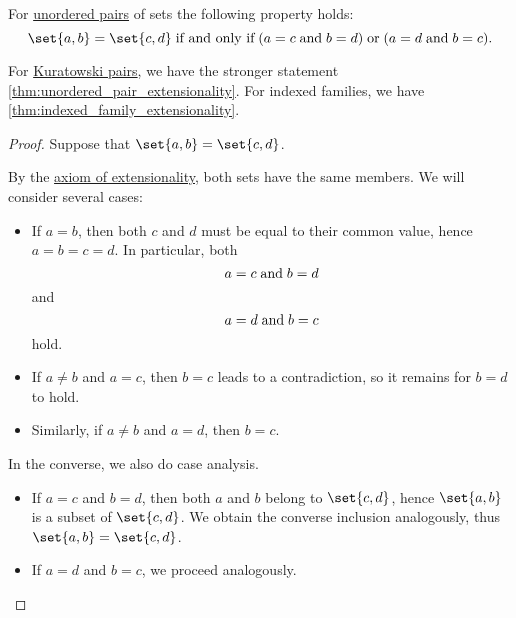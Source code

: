 \begin{proposition}\label{thm:unordered_pair_extensionality}
  For \hyperref[def:unordered_pair]{unordered pairs} of sets the following property holds:
  \begin{equation}\label{eq:thm:unordered_pair_extensionality}
    \set{ a, b } = \set{ c, d } \T{if and only if} (a = c \T{and} b = d) \T{or} (a = d \T{and} b = c).
  \end{equation}
\end{proposition}
\begin{comments}
  \item For \hyperref[def:kuratowski_pair]{Kuratowski pairs}, we have the stronger statement \cref{thm:unordered_pair_extensionality}. For indexed families, we have \cref{thm:indexed_family_extensionality}.
\end{comments}
\begin{proof}
  \SufficiencySubProof Suppose that \( \set{ a, b } = \set{ c, d } \).

  By the \hyperref[def:naive_set_theory/extensionality]{axiom of extensionality}, both sets have the same members. We will consider several cases:
  \begin{itemize}
    \item If \( a = b \), then both \( c \) and \( d \) must be equal to their common value, hence \( a = b = c = d \). In particular, both
    \begin{equation*}
      a = c \T{and} b = d
    \end{equation*}
    and
    \begin{equation*}
      a = d \T{and} b = c
    \end{equation*}
    hold.

    \item If \( a \neq b \) and \( a = c \), then \( b = c \) leads to a contradiction, so it remains for \( b = d \) to hold.

    \item Similarly, if \( a \neq b \) and \( a = d \), then \( b = c \).
  \end{itemize}

  \NecessitySubProof In the converse, we also do case analysis.
  \begin{itemize}
    \item If \( a = c \) and \( b = d \), then both \( a \) and \( b \) belong to \( \set{ c, d } \), hence \( \set{ a, b } \) is a subset of \( \set{ c, d } \). We obtain the converse inclusion analogously, thus \( \set{ a, b } = \set{ c, d } \).

    \item If \( a = d \) and \( b = c \), we proceed analogously.
  \end{itemize}
\end{proof}


